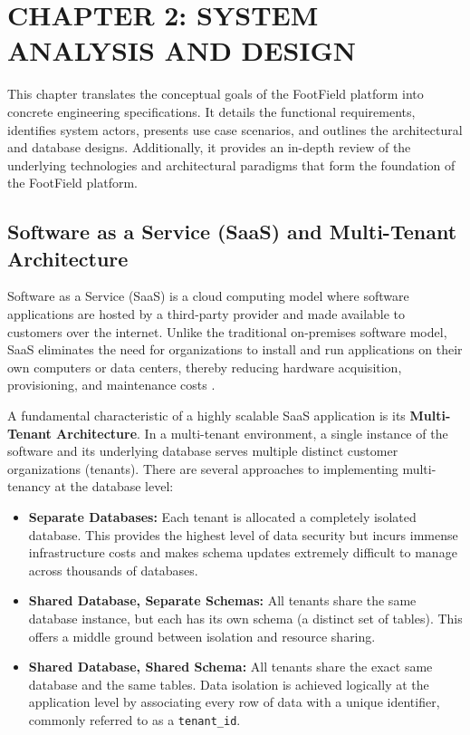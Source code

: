 \section*{CHAPTER 2: SYSTEM ANALYSIS AND DESIGN}
\setcounter{section}{2}
\setcounter{subsection}{0}
\setcounter{figure}{0}
\setcounter{table}{0}

This chapter translates the conceptual goals of the FootField platform into concrete engineering specifications. It details the functional requirements, identifies system actors, presents use case scenarios, and outlines the architectural and database designs. Additionally, it provides an in-depth review of the underlying technologies and architectural paradigms that form the foundation of the FootField platform.

\subsection{Software as a Service (SaaS) and Multi-Tenant Architecture}
Software as a Service (SaaS) is a cloud computing model where software applications are hosted by a third-party provider and made available to customers over the internet. Unlike the traditional on-premises software model, SaaS eliminates the need for organizations to install and run applications on their own computers or data centers, thereby reducing hardware acquisition, provisioning, and maintenance costs \cite{saas_architecture}.

A fundamental characteristic of a highly scalable SaaS application is its \textbf{Multi-Tenant Architecture}. In a multi-tenant environment, a single instance of the software and its underlying database serves multiple distinct customer organizations (tenants). There are several approaches to implementing multi-tenancy at the database level:
\begin{itemize}
    \item \textbf{Separate Databases:} Each tenant is allocated a completely isolated database. This provides the highest level of data security but incurs immense infrastructure costs and makes schema updates extremely difficult to manage across thousands of databases.
    \item \textbf{Shared Database, Separate Schemas:} All tenants share the same database instance, but each has its own schema (a distinct set of tables). This offers a middle ground between isolation and resource sharing.
    \item \textbf{Shared Database, Shared Schema:} All tenants share the exact same database and the same tables. Data isolation is achieved logically at the application level by associating every row of data with a unique identifier, commonly referred to as a \texttt{tenant\_id}. 
\end{itemize}

